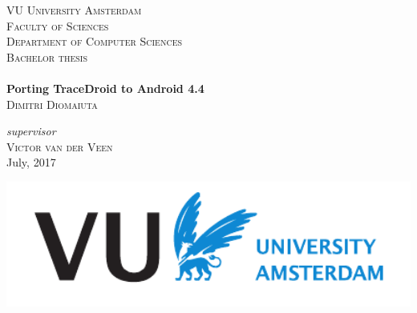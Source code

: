 \begin{titlepage}

\begin{center}
    

    \textsc{\LARGE VU University Amsterdam}\\[0.25cm]
    \textsc{\Large Faculty of Sciences}\\[0.25cm]
    \textsc{\large Department of Computer Sciences}\\[1.5cm]


    \textsc{\Large Bachelor thesis}\\[0.5cm]

    \HRule \\[0.4cm]
    { \huge \bfseries Porting TraceDroid to Android 4.4}
    \HRule \\[0.4cm]
    
    \large
    \textsc{Dimitri Diomaiuta}\\[5cm]



    \begin{flushleft}
        \emph{supervisor}\\   
        \textsc{Victor van der Veen}\\[1cm]
        \large July, 2017
    \end{flushleft}

    \vfill

    \includegraphics[width=1\textwidth]{./img/logo/en-VUlogo-wit.pdf}


\end{center}

\end{titlepage}

